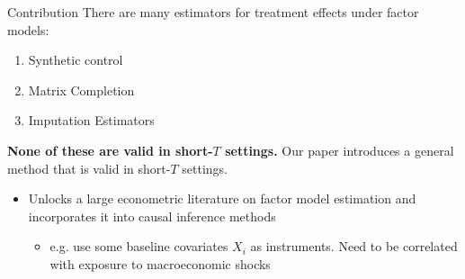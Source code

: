 \documentclass[aspectratio=43,t,11pt]{beamer}
\begin{document}
\begin{frame}{Contribution}
  There are many estimators for treatment effects under factor models:
  \begin{enumerate}
    \item Synthetic control 
    \item Matrix Completion 
    \item Imputation Estimators 
  \end{enumerate}

  \bigskip
  \textbf{None of these are valid in short-$T$ settings.} Our paper introduces a general method that is valid in short-$T$ settings. 

  \begin{itemize}
    \item Unlocks a large econometric literature on factor model estimation and incorporates it into causal inference methods
    \begin{itemize}
      \item e.g. use some baseline covariates $X_i$ as instruments. Need to be correlated with exposure to macroeconomic shocks
    \end{itemize}
  \end{itemize}
\end{frame}

% 
\end{document}
